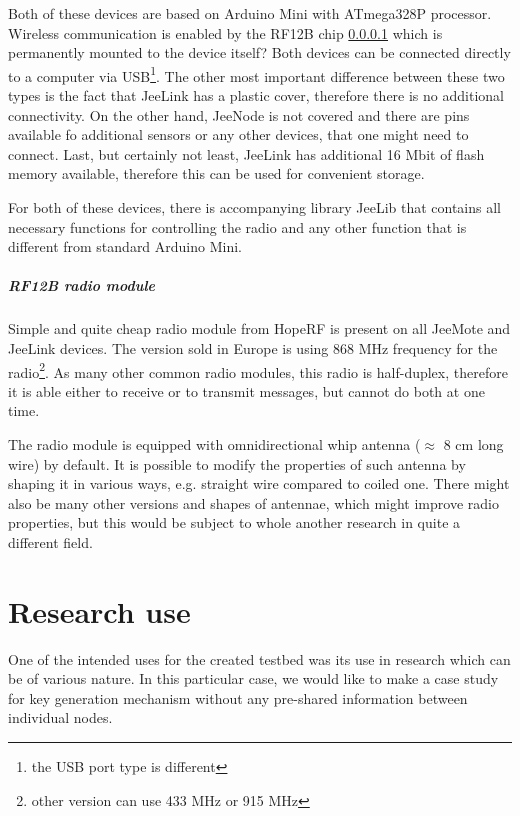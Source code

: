 \documentclass[
  print, %
  table,   %
  nolof,     %
  nolot,     %
           oneside
]{fithesis3}
\begin{document}
  Both of these devices are based on Arduino Mini \cite{ArduinoMini}
  with ATmega328P processor. Wireless communication is enabled by the RF12B chip \ref{par:radio} \cite{RF12B}
  which is permanently mounted to the device itself? Both devices can be connected directly to a computer via USB\footnote{the USB port type is different}. The other most important difference between these two types is the fact that JeeLink has a plastic cover, therefore there is no additional connectivity. On the other hand, JeeNode is not covered and there are pins available fo additional sensors or any other devices, that one might need to connect. Last, but certainly not least, JeeLink has additional 16 Mbit of flash memory \cite{JeeLink}
  available, therefore this can be used for convenient storage.

  For both of these devices, there is accompanying library JeeLib \cite{JeeLib}
  that contains all necessary functions for controlling the radio and any other function that is different from standard Arduino Mini.
  \paragraph{RF12B radio module}\label{par:radio} %
  Simple and quite cheap radio module from HopeRF \cite{RF12B}
  is present on all JeeMote and JeeLink devices. The version sold in Europe is using 868 MHz frequency for the radio\footnote{other version can use 433 MHz or 915 MHz}. As many other common radio modules, this radio is half-duplex, therefore it is able either to receive or to transmit messages, but cannot do both at one time.

  The radio module is equipped with omnidirectional whip antenna ($\approx$ 8 cm long wire) by default. It is possible to modify the properties of such antenna by shaping it in various ways, e.g. straight wire compared to coiled one. There might also be many other versions and shapes of antennae, which might improve radio properties, but this would be subject to whole another research in quite a different field.

\chapter{Research use}\label{ch:research}
  One of the intended uses for the created testbed was its use in research which can be of various nature. In this particular case, we would like to make a case study for key generation mechanism without any pre-shared information between individual nodes.
\end{document}
